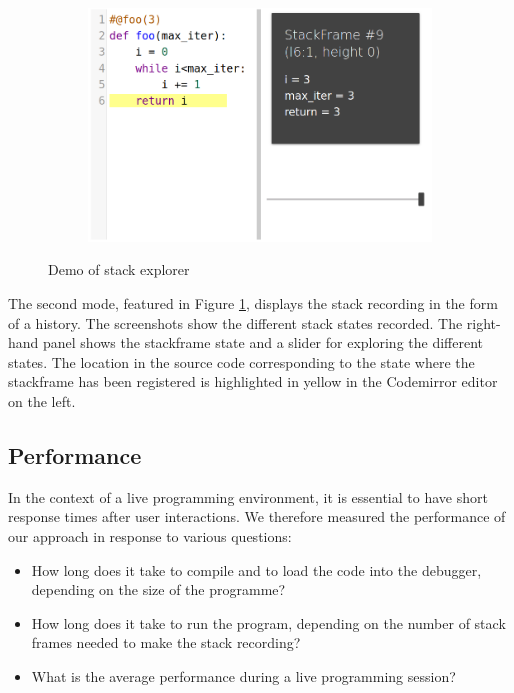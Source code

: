 \documentclass[english,submission]{programming}
\begin{document}
\begin{figure}[htbp]
\begin{subfigure}[b]{0.4\textwidth}
  \end{subfigure}
  \hfill
  \begin{subfigure}[b]{0.4\textwidth}
    \centering
    \includegraphics[width=\textwidth]{img/demo/stack/3.png}
  \end{subfigure}
  \caption{Demo of stack explorer}
  \label{fig:demo-stack}
\end{figure}

The second mode, featured in Figure \ref{fig:demo-stack}, displays the stack recording in the form of a history. The screenshots show the different stack states recorded. The right-hand panel shows the stackframe state and a slider for exploring the different states. The location in the source code corresponding to the state where the stackframe has been registered is highlighted in yellow in the Codemirror editor on the left.

\subsection{Performance}
\label{sec:performance}

In the context of a live programming environment, it is essential to have short response times after user interactions. 
We therefore measured the performance of our approach in response to various questions:

\begin{itemize}
  \item How long does it take to compile and to load the code into the debugger, depending on the size of the programme?
  \item How long does it take to run the program, depending on the number of stack frames needed to make the stack recording?
  \item What is the average performance during a live programming session?
\end{itemize}
\end{document}
